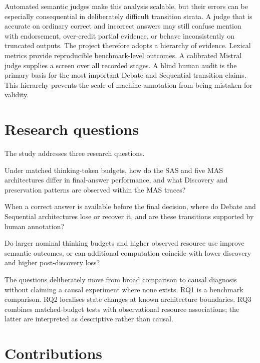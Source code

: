 Automated semantic judges make this analysis scalable, but their errors can be especially consequential in deliberately difficult transition strata. A judge that is accurate on ordinary correct and incorrect answers may still confuse mention with endorsement, over-credit partial evidence, or behave inconsistently on truncated outputs. The project therefore adopts a hierarchy of evidence. Lexical metrics provide reproducible benchmark-level outcomes. A calibrated Mistral judge supplies a screen over all recorded stages. A blind human audit is the primary basis for the most important Debate and Sequential transition claims. This hierarchy prevents the scale of machine annotation from being mistaken for validity.

\section{Research questions}

The study addresses three research questions.

\begin{description}[leftmargin=1.5cm,style=nextline]
  \item[RQ1] Under matched thinking-token budgets, how do the SAS and five MAS architectures differ in final-answer performance, and what Discovery and preservation patterns are observed within the MAS traces?
  \item[RQ2] When a correct answer is available before the final decision, where do Debate and Sequential architectures lose or recover it, and are these transitions supported by human annotation?
  \item[RQ3] Do larger nominal thinking budgets and higher observed resource use improve semantic outcomes, or can additional computation coincide with lower discovery and higher post-discovery loss?
\end{description}

The questions deliberately move from broad comparison to causal diagnosis without claiming a causal experiment where none exists. RQ1 is a benchmark comparison. RQ2 localises state changes at known architecture boundaries. RQ3 combines matched-budget tests with observational resource associations; the latter are interpreted as descriptive rather than causal.

\section{Contributions}

